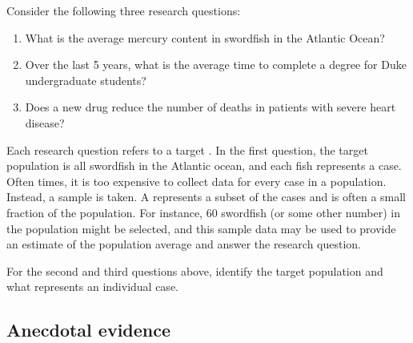 Consider the following three research questions:
\begin{enumerate}
\setlength{\itemsep}{0mm}
\item What is the average mercury content in swordfish in the Atlantic Ocean?
\item\label{timeToGraduationQuestionForUCLAStudents} Over the last 5 years, what is the average time to complete a degree for Duke undergraduate students?
\item\label{identifyPopulationOfStentStudy} Does a new drug reduce the number of deaths in patients with severe heart disease?
\end{enumerate}
Each research question refers to a target . In the first question, the target population is all swordfish in the Atlantic ocean, and each fish represents a case. Often times, it is too expensive to collect data for every case in a population. Instead, a sample is taken. A  represents a subset of the cases and is often a small fraction of the population. For instance, 60 swordfish (or some other number) in the population might be selected, and this sample data may be used to provide an estimate of the population average and answer the research question.

\begin{exercisewrap}
\begin{nexercise}\label{identifyingThePopulationForTwoQuestionsInPopAndSampSubsection}%
For the second and third questions above,
identify the target population and what
represents an individual case.\footnotemark
\end{nexercise}
\end{exercisewrap}


\subsection{Anecdotal evidence}
\label{anecdotalEvidenceSubsection}

